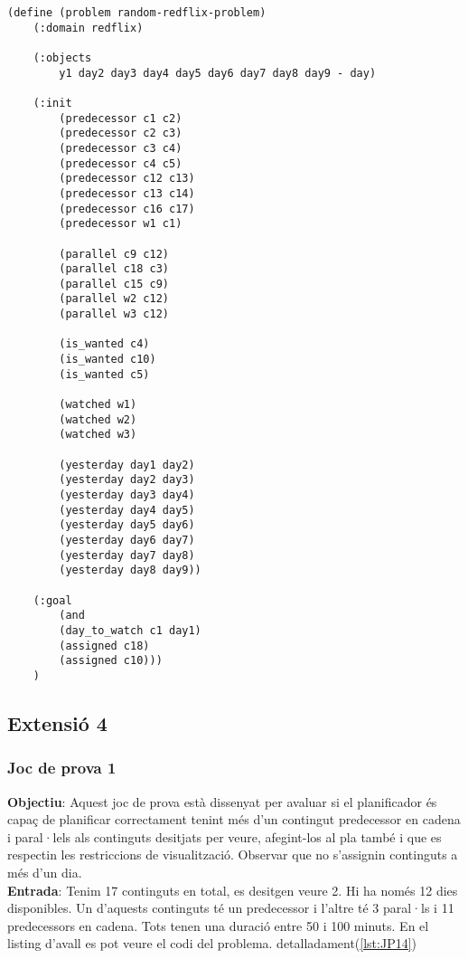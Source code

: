 \documentclass[a4paper]{article}
\begin{document}
	\begin{lstlisting}[language=PDDL, caption={Joc de Prova Random - Extensió 3}, label={lst:JPR3}]                  
	(define (problem random-redflix-problem)
	(:domain redflix)
	
	(:objects
		y1 day2 day3 day4 day5 day6 day7 day8 day9 - day)
	
	(:init
		(predecessor c1 c2)
		(predecessor c2 c3)
		(predecessor c3 c4)
		(predecessor c4 c5)
		(predecessor c12 c13)
		(predecessor c13 c14)
		(predecessor c16 c17)
		(predecessor w1 c1)
		
		(parallel c9 c12)
		(parallel c18 c3)
		(parallel c15 c9)
		(parallel w2 c12)
		(parallel w3 c12)
		
		(is_wanted c4)
		(is_wanted c10)
		(is_wanted c5)
		
		(watched w1)
		(watched w2)
		(watched w3)
		
		(yesterday day1 day2)
		(yesterday day2 day3)
		(yesterday day3 day4)
		(yesterday day4 day5)
		(yesterday day5 day6)
		(yesterday day6 day7)
		(yesterday day7 day8)
		(yesterday day8 day9))
	
	(:goal
		(and
		(day_to_watch c1 day1)
		(assigned c18)
		(assigned c10)))
	)	
	\end{lstlisting}
	
	\subsection{Extensió 4}
	\subsubsection*{Joc de prova 1}
	
	\noindent \textbf{Objectiu}: Aquest joc de prova està dissenyat per avaluar si el planificador és capaç de planificar correctament tenint més d'un contingut predecessor en cadena i paral·lels als continguts desitjats per veure, afegint-los al pla també i que es respectin les restriccions de visualització. Observar que no s'assignin continguts a més d'un dia.  \\
	
	\noindent \textbf{Entrada}: Tenim 17 continguts en total, es desitgen veure 2. Hi ha només 12 dies disponibles. Un d'aquests continguts té un predecessor i l'altre té 3 paral·ls i 11 predecessors en cadena. Tots tenen una duració entre 50 i 100 minuts. En el listing d'avall es pot veure el codi del problema.  detalladament(\ref{lst:JP14}) \\
	
\end{document}
